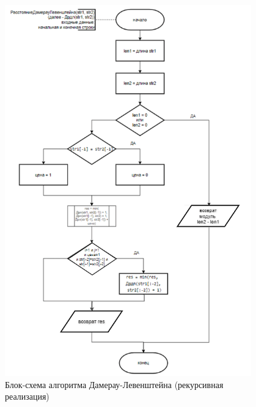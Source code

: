\begin{figure}[H]
    \centering
    \includegraphics[width=0.95\textwidth]{img/block_2_2.png}
    \caption{Блок-схема алгоритма Дамерау-Левенштейна (рекурсивная реализация)}
    \label{fig:block_2_2}
\end{figure}

